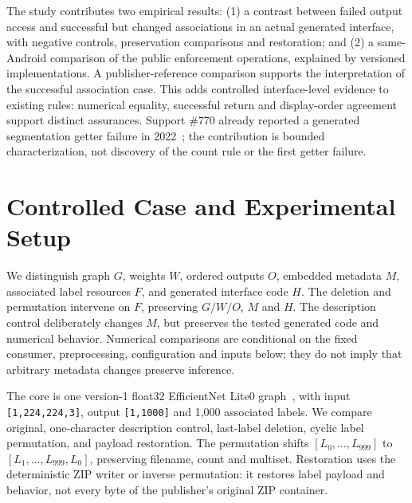 \documentclass[10pt,conference]{IEEEtran}
\newcommand{\code}[1]{\texttt{#1}}
\begin{document}
The study contributes two empirical results: (1) a contrast between failed output access and successful but changed associations in an actual generated interface, with negative controls, preservation comparisons and restoration; and (2) a same-Android comparison of the public enforcement operations, explained by versioned implementations. A publisher-reference comparison supports the interpretation of the successful association case. This adds controlled interface-level evidence to existing rules: numerical equality, successful return and display-order agreement support distinct assurances. Support \#770 already reported a generated segmentation getter failure in 2022~\cite{support770,support770reply}; the contribution is bounded characterization, not discovery of the count rule or the first getter failure.

\section{Controlled Case and Experimental Setup}
\label{sec:setup}
We distinguish graph $G$, weights $W$, ordered outputs $O$, embedded metadata $M$, associated label resources $F$, and generated interface code $H$. The deletion and permutation intervene on $F$, preserving $G/W/O$, $M$ and $H$. The description control deliberately changes $M$, but preserves the tested generated code and numerical behavior. Numerical comparisons are conditional on the fixed consumer, preprocessing, configuration and inputs below; they do not imply that arbitrary metadata changes preserve inference.

The core is one version-1 float32 EfficientNet Lite0 graph~\cite{efficientnet}, with input \code{[1,224,224,3]}, output \code{[1,1000]} and 1,000 associated labels. We compare original, one-character description control, last-label deletion, cyclic label permutation, and payload restoration. The permutation shifts $[L_0,\ldots,L_{999}]$ to $[L_1,\ldots,L_{999},L_0]$, preserving filename, count and multiset. Restoration uses the deterministic ZIP writer or inverse permutation: it restores label payload and behavior, not every byte of the publisher's original ZIP container.
\end{document}
